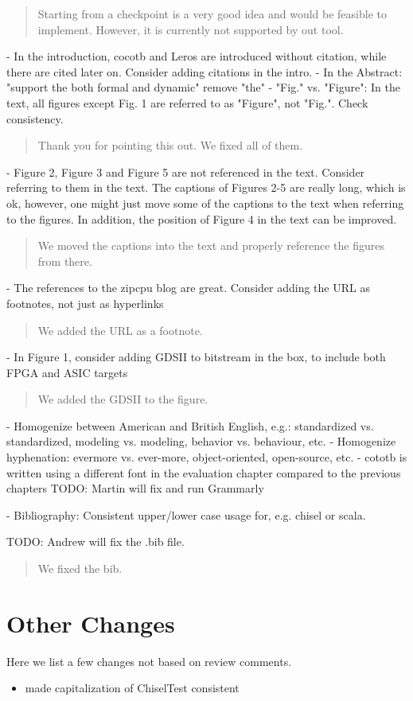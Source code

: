 \documentclass{article}
\newcommand{\todo}[1]{{\color{olive} TODO: #1}}
\newcommand{\reply}[1]{{\color{blue} #1}}
\begin{document}
\begin{quote}
\reply{
Starting from a checkpoint is a very good idea and would be feasible to implement. However, it is currently not supported by out tool.
}
\end{quote}

- In the introduction, cocotb and Leros are introduced without citation, while there are cited later on. Consider adding citations in the intro.
- In the Abstract: "support the both formal and dynamic" remove "the"
- "Fig." vs. "Figure": In the text, all figures except Fig. 1 are referred to as "Figure", not "Fig.". Check consistency.

\begin{quote}
\reply{Thank you for pointing this out. We fixed all of them.}
\end{quote}

- Figure 2, Figure 3 and Figure 5 are not referenced in the text. Consider referring to them in the text. The captions of Figures 2-5 are really long, which is ok, however, one might just move some of the captions to the text when referring to the figures. In addition, the position of Figure 4 in the text can be improved. 

\begin{quote}
\reply{
We moved the captions into the text and properly reference the figures from there.
}
\end{quote}


- The references to the zipcpu blog are great. Consider adding the URL as footnotes, not just as hyperlinks

\begin{quote}
\reply{
We added the URL as a footnote.
}\end{quote}

- In Figure 1, consider adding GDSII to bitstream in the box, to include both FPGA and ASIC targets

\begin{quote}
\reply{
We added the GDSII to the figure.
}\end{quote}

- Homogenize between American and British English, e.g.: standardized vs. standardized, modeling vs. modeling, behavior vs. behaviour, etc.
- Homogenize hyphenation: evermore vs. ever-more, object-oriented, open-source, etc.
- cototb is written using a different font in the evaluation chapter compared to the previous chapters
\todo{Martin will fix and run Grammarly}

- Bibliography: Consistent upper/lower case usage for, e.g. chisel or scala.

\todo{Andrew will fix the .bib file.}

\begin{quote}
\reply{
We fixed the bib.
}\end{quote}



\section*{Other Changes}

Here we list a few changes not based on review comments.

\begin{itemize}
	\item  made capitalization of ChiselTest consistent
\end{itemize}
\end{document}
